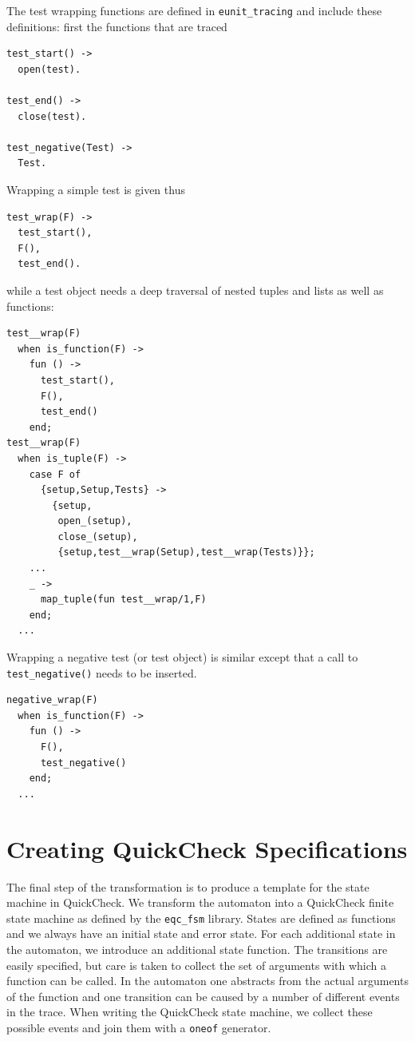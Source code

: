 \documentclass[]{sigplanconf}
\begin{document}
The test wrapping functions are defined in \texttt{eunit\_tracing} and include these definitions: first the functions that are traced
\begin{verbatim}
test_start() ->
  open(test).

test_end() ->
  close(test).

test_negative(Test) ->
  Test.
\end{verbatim}
Wrapping a simple test is given thus
\begin{verbatim}
test_wrap(F) ->
  test_start(),
  F(),
  test_end().
\end{verbatim}
while a test object needs a deep traversal of nested tuples and lists as well as functions:
\begin{verbatim}
test__wrap(F)
  when is_function(F) ->
    fun () ->
      test_start(),
      F(),
      test_end()
    end;  
test__wrap(F)
  when is_tuple(F) ->
    case F of
      {setup,Setup,Tests} ->
        {setup,
         open_(setup),
         close_(setup),
         {setup,test__wrap(Setup),test__wrap(Tests)}};
    ...
    _ ->   
      map_tuple(fun test__wrap/1,F)
    end;
  ...
\end{verbatim}
Wrapping a negative test (or test object) is similar except that a call to \texttt{test\_negative()} needs to be inserted.
\begin{verbatim}
negative_wrap(F)
  when is_function(F) ->
    fun () ->
      F(),
      test_negative()
    end;  
  ...
\end{verbatim}

\section{Creating QuickCheck Specifications}
\label{ToQC}

The final step of the transformation is to produce a template for the state machine in QuickCheck. We transform the automaton into a QuickCheck finite state machine as defined by the \verb+eqc_fsm+ library. States are defined as functions and we always have an initial state and error state. For each additional state in the automaton, we introduce an additional state function.
The transitions are easily specified, but care is taken to collect the set of arguments with which a function can be called. In the automaton one abstracts from the actual arguments of the function and one transition can be caused by a number of different events in the trace. When writing the QuickCheck state machine, we collect these possible events and join them with a \verb+oneof+ generator. 
\end{document}
